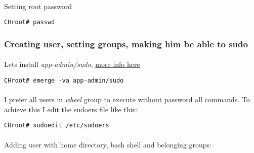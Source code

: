 \documentclass[10pt,a4paper]{article}
\begin{document}
                    \paragraph{} Setting root password
                    
                    \begin{lstlisting}[style=BashInputCHRoot]
 CHroot# passwd
                    \end{lstlisting}
                    
                \newpage
                \subsubsection{Creating user, setting groups, making him be able to sudo}
                    
                    \paragraph{} Lets install \textit{app-admin/sudo},  \href{https://wiki.gentoo.org/wiki/Sudo}{more info here}
                    
                    \begin{lstlisting}[style=BashInputCHRoot]
 CHroot# emerge -va app-admin/sudo
                    \end{lstlisting}
                    
                    \paragraph{} I prefer all users in \textit{wheel} group to execute without password all commands. To achieve this I edit the sudoers file like this:
                    
                    \begin{lstlisting}[style=BashInputCHRoot]
 CHroot# sudoedit /etc/sudoers
                    \end{lstlisting}
                    

                    
                    \paragraph{} Adding user with home directory, bash shell and belonging groups: 
                    
\end{document}
